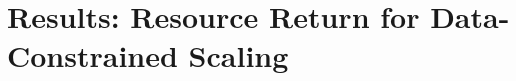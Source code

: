 \documentclass{article}
\begin{document}


\section{Results: Resource Return for Data-Constrained Scaling}
\label{sec:fixc}
\end{document}
